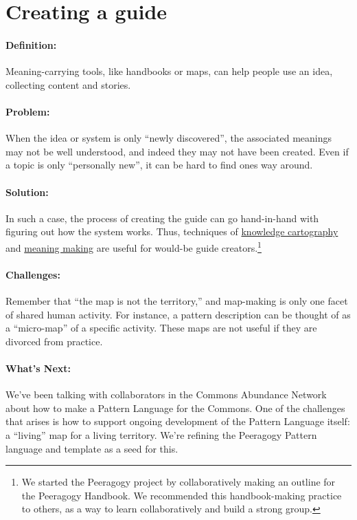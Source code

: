 \section{Creating a guide}
\paragraph{Definition:} Meaning-carrying tools, like handbooks or maps, can
help people use an idea, collecting content and stories.

\paragraph{Problem:} When the idea or system is only ``newly discovered'',
the associated meanings may not be well understood, and indeed they may
not have been created. Even if a topic is only ``personally new'', it
can be hard to find ones way around.

\paragraph{Solution:} In such a case, the process of creating the guide can
go hand-in-hand with figuring out how the system works. Thus, techniques
of \href{http://knowledgecartography.org/}{knowledge cartography}
and \href{http://www.hitl.washington.edu/publications/r-97-47/two.html}{meaning
making} are useful for would-be guide creators.\footnote{We started the Peeragogy project by collaboratively
making an outline for the Peeragogy Handbook. We recommended this
handbook-making practice to others, as a way to learn collaboratively
and build a strong group.}

\paragraph{Challenges:} Remember that ``the map is not the territory,'' and
map-making is only one facet of shared human activity. For instance, a
pattern description can be thought of as a ``micro-map'' of a specific
activity. These maps are not useful if they are divorced from practice.

\paragraph{What's Next:} We've been talking with collaborators in the
Commons Abundance Network about how to make a Pattern Language for the
Commons. One of the challenges that arises is how to support ongoing
development of the Pattern Language itself: a ``living'' map for a
living territory. We're refining the Peeragogy Pattern language and
template as a seed for this.
